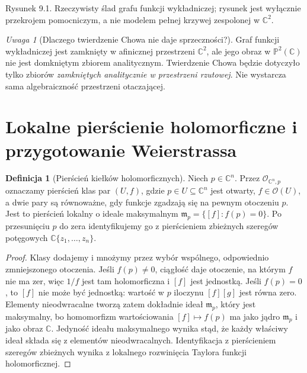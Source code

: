 \documentclass[11pt,a4paper,openany]{report}
\numberwithin{equation}{section}
\theoremstyle{plain}
\theoremstyle{definition}
\newtheorem{definicja}[twierdzenie]{Definicja}
\theoremstyle{remark}
\newtheorem{uwaga}[twierdzenie]{Uwaga}
\newcommand{\C}{\mathbb C}
\newcommand{\PP}{\mathbb P}
\begin{document}
\begin{center}

{\small Rysunek 9.1. Rzeczywisty ślad grafu funkcji wykładniczej;
rysunek jest wyłącznie przekrojem pomocniczym, a nie modelem
pełnej krzywej zespolonej w $\C^2$.}\par
\end{center}

\begin{uwaga}[Dlaczego twierdzenie Chowa nie daje sprzeczności?]
Graf funkcji wykładniczej jest zamknięty w afinicznej przestrzeni
$\C^2$, ale jego obraz w $\PP^2(\C)$ nie jest domkniętym zbiorem
analitycznym. Twierdzenie Chowa będzie dotyczyło tylko zbiorów
\emph{zamkniętych analitycznie w przestrzeni rzutowej}.
Nie wystarcza sama algebraiczność przestrzeni otaczającej.
\end{uwaga}

\section{Lokalne pierścienie holomorficzne i przygotowanie Weierstrassa}
\label{sec:ga9-lokalne}

\begin{definicja}[Pierścień kiełków holomorficznych]
Niech $p\in\C^n$. Przez $\mathcal O_{\C^n,p}$ oznaczamy pierścień
klas par $(U,f)$, gdzie $p\in U\subseteq\C^n$ jest otwarty,
$f\in\mathcal O(U)$, a dwie pary są równoważne, gdy funkcje
zgadzają się na pewnym otoczeniu $p$. Jest to pierścień lokalny
o ideale maksymalnym $\mathfrak m_p=\{[f]:f(p)=0\}$.
Po przesunięciu $p$ do zera identyfikujemy go z pierścieniem
zbieżnych szeregów potęgowych $\C\{z_1,\ldots,z_n\}$.
\end{definicja}

\begin{proof}
Klasy dodajemy i mnożymy przez wybór wspólnego, odpowiednio
zmniejszonego otoczenia. Jeśli $f(p)\ne0$, ciągłość daje
otoczenie, na którym $f$ nie ma zer, więc $1/f$ jest tam
holomorficzna i $[f]$ jest jednostką. Jeśli $f(p)=0$,
to $[f]$ nie może być jednostką: wartość w $p$ iloczynu
$[f][g]$ jest równa zero. Elementy nieodwracalne tworzą
zatem dokładnie ideał $\mathfrak m_p$, który jest maksymalny,
bo homomorfizm wartościowania $[f]\mapsto f(p)$ ma jako
jądro $\mathfrak m_p$ i jako obraz $\C$. Jedyność ideału
maksymalnego wynika stąd, że każdy właściwy ideał składa się
z elementów nieodwracalnych. Identyfikacja z pierścieniem
szeregów zbieżnych wynika z lokalnego rozwinięcia Taylora
funkcji holomorficznej.
\end{proof}
\end{document}
